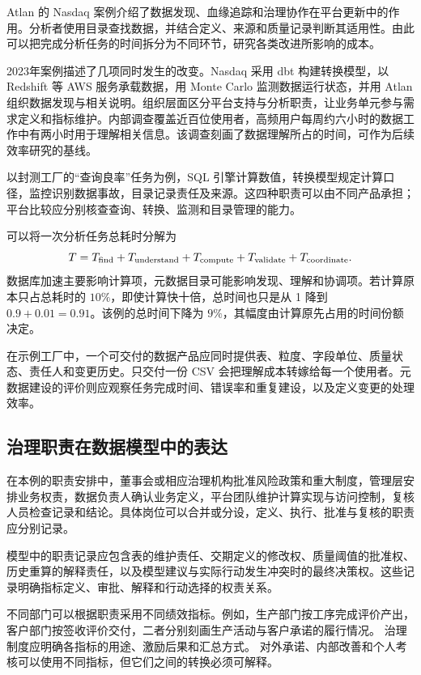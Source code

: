 Atlan 的 Nasdaq 案例介绍了数据发现、血缘追踪和治理协作在平台更新中的作用\cite{atlan02}。分析者使用目录查找数据，并结合定义、来源和质量记录判断其适用性。由此可以把完成分析任务的时间拆分为不同环节，研究各类改进所影响的成本。

2023年案例描述了几项同时发生的改变。Nasdaq 采用 dbt 构建转换模型，以 Redshift 等 AWS 服务承载数据，用 Monte Carlo 监测数据运行状态，并用 Atlan 组织数据发现与相关说明。组织层面区分平台支持与分析职责，让业务单元参与需求定义和指标维护。内部调查覆盖近百位使用者，高频用户每周约六小时的数据工作中有两小时用于理解相关信息。该调查刻画了数据理解所占的时间，可作为后续效率研究的基线。

以封测工厂的“查询良率”任务为例，SQL 引擎计算数值，转换模型规定计算口径，监控识别数据事故，目录记录责任及来源。这四种职责可以由不同产品承担；平台比较应分别核查查询、转换、监测和目录管理的能力。

可以将一次分析任务总耗时分解为
\[
T=T_{\rm find}+T_{\rm understand}+T_{\rm compute}
+T_{\rm validate}+T_{\rm coordinate}.
\]
数据库加速主要影响计算项，元数据目录可能影响发现、理解和协调项。若计算原本只占总耗时的 \(10\%\)，即使计算快十倍，总时间也只是从 1 降到 \(0.9+0.01=0.91\)。该例的总时间下降为 \(9\%\)，其幅度由计算原先占用的时间份额决定。

在示例工厂中，一个可交付的数据产品应同时提供表、粒度、字段单位、质量状态、责任人和变更历史。只交付一份 CSV 会把理解成本转嫁给每一个使用者。元数据建设的评价则应观察任务完成时间、错误率和重复建设，以及定义变更的处理效率。

\subsection{治理职责在数据模型中的表达}

在本例的职责安排中，董事会或相应治理机构批准风险政策和重大制度，管理层安排业务权责，数据负责人确认业务定义，平台团队维护计算实现与访问控制，复核人员检查记录和结论。具体岗位可以合并或分设，定义、执行、批准与复核的职责应分别记录。

模型中的职责记录应包含表的维护责任、交期定义的修改权、质量阈值的批准权、历史重算的解释责任，以及模型建议与实际行动发生冲突时的最终决策权。这些记录明确指标定义、审批、解释和行动选择的权责关系。

不同部门可以根据职责采用不同绩效指标。例如，生产部门按工序完成评价产出，
客户部门按签收评价交付，二者分别刻画生产活动与客户承诺的履行情况。
治理制度应明确各指标的用途、激励后果和汇总方式。
对外承诺、内部改善和个人考核可以使用不同指标，但它们之间的转换必须可解释。

